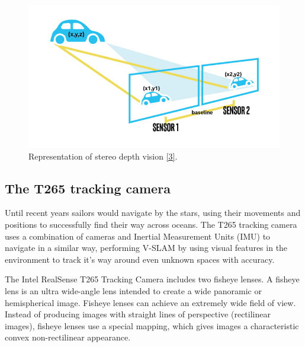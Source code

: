 \documentclass{article}
\begin{document}
\begin{figure}[h] %
	\centering
	\includegraphics[width=1\columnwidth]{report1-img002.png} %
	\caption{Representation of stereo depth vision \href{https://www.intelrealsense.com/beginners-guide-to-depth/}{[3]}.}
\end{figure}


\subsection{The T265 tracking camera}

Until recent years sailors would navigate by the stars, using their movements and positions to successfully find their way across oceans. The T265 tracking camera uses a combination of cameras and Inertial Measurement Units (IMU) to navigate in a similar way, performing V-SLAM by using visual features in the environment to track it’s way around even unknown spaces with accuracy. 

The Intel RealSense T265 Tracking Camera includes two fisheye lenses. A fisheye lens is an ultra wide-angle lens intended to create a wide panoramic or hemispherical image. Fisheye lenses can achieve an extremely wide field of view. Instead of producing images with straight lines of perspective (rectilinear images), fisheye lenses use a special mapping, which gives images a characteristic convex non-rectilinear appearance. 
\end{document}
